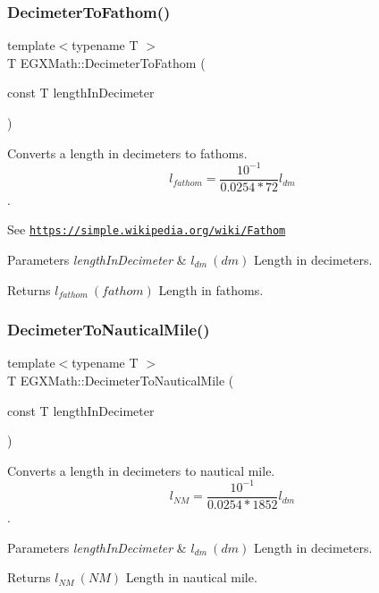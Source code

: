 \subsubsection{\texorpdfstring{Decimeter\+To\+Fathom()}{DecimeterToFathom()}}
{\footnotesize\ttfamily template$<$typename T $>$ \\
T E\+G\+X\+Math\+::\+Decimeter\+To\+Fathom (\begin{DoxyParamCaption}\item[{const T}]{length\+In\+Decimeter }\end{DoxyParamCaption})}



Converts a length in decimeters to fathoms. \[ l_{fathom}= \frac{10^{-1}}{0.0254 * 72} l_{dm} \]. 

See \href{https://simple.wikipedia.org/wiki/Fathom}{\tt https\+://simple.\+wikipedia.\+org/wiki/\+Fathom} 
\begin{DoxyParams}{Parameters}
{\em length\+In\+Decimeter} & $ l_{dm}\ (dm)$ Length in decimeters. \\
\hline
\end{DoxyParams}
\begin{DoxyReturn}{Returns}
$ l_{fathom}\ (fathom)$ Length in fathoms. 
\end{DoxyReturn}
\mbox{\label{group___e_g_x_math-_conversions-_length_conversions-_decimeter-_nautical_ga6cc0e9987da30da6a30ddba50971ba2d}} 
\subsubsection{\texorpdfstring{Decimeter\+To\+Nautical\+Mile()}{DecimeterToNauticalMile()}}
{\footnotesize\ttfamily template$<$typename T $>$ \\
T E\+G\+X\+Math\+::\+Decimeter\+To\+Nautical\+Mile (\begin{DoxyParamCaption}\item[{const T}]{length\+In\+Decimeter }\end{DoxyParamCaption})}



Converts a length in decimeters to nautical mile. \[ l_{NM}= \frac{10^{-1}}{0.0254 * 1852} l_{dm} \]. 


\begin{DoxyParams}{Parameters}
{\em length\+In\+Decimeter} & $ l_{dm}\ (dm)$ Length in decimeters. \\
\hline
\end{DoxyParams}
\begin{DoxyReturn}{Returns}
$ l_{NM}\ (NM)$ Length in nautical mile. 
\end{DoxyReturn}
